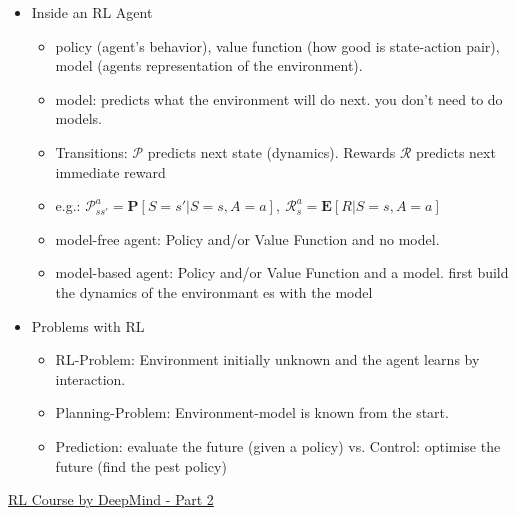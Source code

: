 \begin{itemize}[noitemsep,nolistsep]
\begin{itemize}
	\end{itemize} 
	\item Inside an RL Agent
	\begin{itemize}[noitemsep,nolistsep]
		\item policy (agent's behavior), value function (how good is state-action pair), model (agents representation of the environment).
		\item model: predicts what the environment will do next. you don't need to do models.
		\item Transitions: $\mathcal{P}$ predicts next state (dynamics). Rewards $\mathcal{R}$ predicts next immediate reward
		\item e.g.: $\mathcal{P}_{ss'}^a = \mathbf{P}[S=s'| S=s, A=a],\ \mathcal{R}_s^a = \mathbf{E}[R|S=s, A=a]$
		\item model-free agent: Policy and/or Value Function and no model.
		\item model-based agent: Policy and/or Value Function and a model. first build the dynamics of the environmant es with the model
	\end{itemize} 
	\item Problems with RL
	\begin{itemize}[noitemsep,nolistsep]
		\item RL-Problem: Environment initially unknown and the agent learns by interaction.
		\item Planning-Problem: Environment-model is known from the start. 
		\item Prediction: evaluate the future (given a policy) vs. Control: optimise the future (find the pest policy)
	\end{itemize} 
\end{itemize} 
\href{https://www.youtube.com/watch?v=lfHX2hHRMVQ&list=PLqYmG7hTraZDM-OYHWgPebj2MfCFzFObQ&index=2}{RL Course by DeepMind - Part 2}
